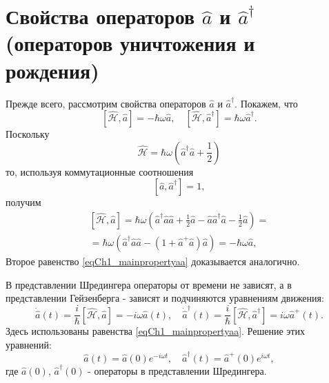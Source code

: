 \section{Свойства операторов $ \hat a $ и $ \hat a ^\dag $ (операторов
  уничтожения и рождения)} 
Прежде всего, рассмотрим свойства операторов $\hat{a}$  и
$\hat{a}^{\dag}$.  Покажем, что 
\begin{equation}
\left[\hat{\mathcal{H}}, \hat{a}\right] = 
- \hbar \omega \hat{a}, \quad
\left[\hat{\mathcal{H}}, \hat{a}^{\dag}\right] = 
\hbar \omega \hat{a}^{\dag}.
\label{eqCh1_mainpropertyaa}
\end{equation}
Поскольку  
\[
\hat{\mathcal{H}} =  
\hbar \omega \left(\hat{a}^{\dag} \hat{a} +
\frac{1}{2}\right)
\]
то, используя коммутационные соотношения
\[
\left[\hat{a}, \hat{a}^{\dag}\right] = 1,
\]  
получим
\begin{eqnarray}
\left[\hat{\mathcal{H}}, \hat{a}\right] = 
\hbar \omega \left( 
\hat{a}^{\dag}\hat{a}\hat{a} + \frac{1}{2} \hat{a} -
\hat{a}\hat{a}^{\dag}\hat{a} - \frac{1}{2}\hat{a} 
\right)
= 
\nonumber \\ 
= \hbar \omega\left(
\hat{a}^{\dag}\hat{a}\hat{a} - \left(1 + \hat{a}^{+}\hat{a}\right)\hat{a} 
\right) = - \hbar \omega \hat{a} 
,
\nonumber
\end{eqnarray}
Второе равенство \eqref{eqCh1_mainpropertyaa} доказывается
аналогично. 

В представлении Шредингера операторы от времени не зависят, а в
представлении Гейзенберга - зависят и подчиняются уравнениям движения: 
\begin{equation}
\dot{\hat{a}}\left(t\right) = \frac{i}{\hbar}\left[\hat{\mathcal{H}},
  \hat{a}\right] = -i \omega \hat{a}\left(t\right), \quad
\dot{\hat{a}}^{\dag}\left(t\right) = \frac{i}{\hbar}\left[\hat{\mathcal{H}},
  \hat{a}^{\dag}\right] = i \omega \hat{a}^{+}\left(t\right).
\label{eqCh1_54}
\end{equation}
Здесь использованы равенства \eqref{eqCh1_mainpropertyaa}. Решение
этих уравнений: 
\begin{equation}
\hat{a}\left(t\right) = \hat{a}\left(0\right) e^{- i \omega t}, \quad
\hat{a}^{\dag}\left(t\right) = \hat{a}^{+}\left(0\right) e^{i \omega t}, 
\end{equation}
где  $\hat{a}\left(0\right)$, $\hat{a}^{\dag}\left(0\right)$ - операторы
в представлении Шредингера.
